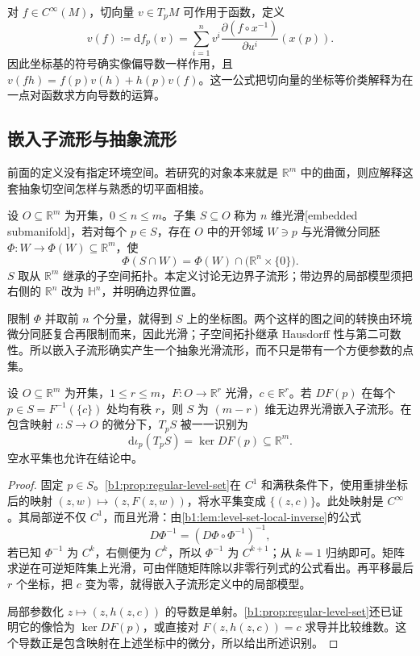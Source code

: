 对 \(f\in C^\infty(M)\)，切向量 \(v\in T_pM\) 可作用于函数，定义
\[
 v(f)\coloneqq\mathrm{d}f_p(v)
 =\sum_{i=1}^n v^i
 \frac{\partial(f\circ x^{-1})}{\partial u^i}(x(p)).
\]
因此坐标基的符号确实像偏导数一样作用，且 \(v(fh)=f(p)v(h)+h(p)v(f)\)。这一公式把切向量的坐标等价类解释为在一点对函数求方向导数的运算。

\subsection{嵌入子流形与抽象流形}
\label{b1:subsec:E10103}

前面的定义没有指定环境空间。若研究的对象本来就是 \(\mathbb R^m\) 中的曲面，则应解释这套抽象切空间怎样与熟悉的切平面相接。

\begin{definition}[嵌入子流形]\label{b1:def:E-embedded-submanifold}
设 \(O\subseteq\mathbb R^m\) 为开集，\(0\leq n\leq m\)。子集 \(S\subseteq O\) 称为 \(n\) 维光滑[embedded submanifold]，若对每个 \(p\in S\)，存在 \(O\) 中的开邻域 \(W\ni p\) 与光滑微分同胚 \(\Phi:W\rightarrow\Phi(W)\subseteq\mathbb R^m\)，使
\[
 \Phi(S\cap W)=\Phi(W)\cap
 \bigl(\mathbb R^n\times\{0\}\bigr).
\]
\(S\) 取从 \(\mathbb R^m\) 继承的子空间拓扑。本定义讨论无边界子流形；带边界的局部模型须把右侧的 \(\mathbb R^n\) 改为 \(\mathbb H^n\)，并明确边界位置。
\end{definition}

限制 \(\Phi\) 并取前 \(n\) 个分量，就得到 \(S\) 上的坐标图。两个这样的图之间的转换由环境微分同胚复合再限制而来，因此光滑；子空间拓扑继承 Hausdorff 性与第二可数性。所以嵌入子流形确实产生一个抽象光滑流形，而不只是带有一个方便参数的点集。

\begin{proposition}[光滑水平集与其切空间]\label{b1:prop:E-regular-level}
设 \(O\subseteq\mathbb R^m\) 为开集，\(1\leq r\leq m\)，\(F:O\rightarrow\mathbb R^r\) 光滑，\(c\in\mathbb R^r\)。若 \(DF(p)\) 在每个 \(p\in S=F^{-1}(\{c\})\) 处均有秩 \(r\)，则 \(S\) 为 \((m-r)\) 维无边界光滑嵌入子流形。在包含映射 \(\iota:S\rightarrow O\) 的微分下，\(T_pS\) 被一一识别为
\[
 \mathrm{d}\iota_p(T_pS)=\ker DF(p)\subseteq\mathbb R^m.
\]
空水平集也允许在结论中。
\end{proposition}
\begin{proof}
固定 \(p\in S\)。\cref{b1:prop:regular-level-set}在 \(C^1\) 和满秩条件下，使用重排坐标后的映射 \((z,w)\mapsto(z,F(z,w))\)，将水平集变成 \(\{(z,c)\}\)。此处映射是 \(C^\infty\)。其局部逆不仅 \(C^1\)，而且光滑：由\cref{b1:lem:level-set-local-inverse}的公式
\[
 D\Phi^{-1}=(D\Phi\circ\Phi^{-1})^{-1},
\]
若已知 \(\Phi^{-1}\) 为 \(C^k\)，右侧便为 \(C^k\)，所以 \(\Phi^{-1}\) 为 \(C^{k+1}\)；从 \(k=1\) 归纳即可。矩阵求逆在可逆矩阵集上光滑，可由伴随矩阵除以非零行列式的公式看出。再平移最后 \(r\) 个坐标，把 \(c\) 变为零，就得嵌入子流形定义中的局部模型。

局部参数化 \(z\mapsto(z,h(z,c))\) 的导数是单射。\cref{b1:prop:regular-level-set}还已证明它的像恰为 \(\ker DF(p)\)，或直接对 \(F(z,h(z,c))=c\) 求导并比较维数。这个导数正是包含映射在上述坐标中的微分，所以给出所述识别。
\end{proof}

